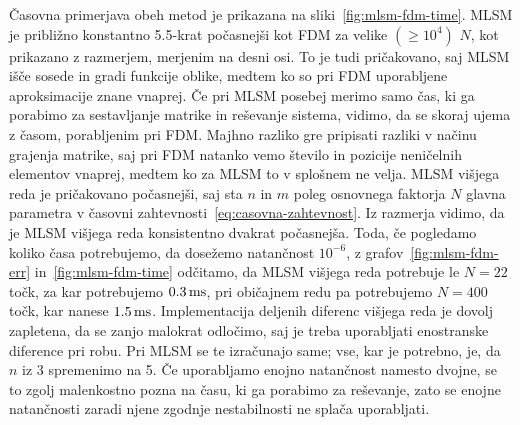 \documentclass[12pt,a4paper,twoside]{article}
\theoremstyle{definition} %
\theoremstyle{plain} %
\numberwithin{equation}{section}
\begin{document}
Časovna primerjava obeh metod je prikazana na sliki~\ref{fig:mlsm-fdm-time}. MLSM je približno
konstantno 5.5-krat počasnejši kot FDM za velike $(\geq 10^4)$ $N$, kot prikazano z razmerjem,
merjenim na desni osi. To je tudi pričakovano, saj MLSM išče sosede in gradi funkcije oblike, medtem
ko so pri FDM uporabljene aproksimacije znane vnaprej. Če pri MLSM posebej merimo samo čas, ki ga
porabimo za sestavljanje matrike in reševanje sistema, vidimo, da se skoraj ujema z časom,
porabljenim pri FDM. Majhno razliko gre pripisati razliki v načinu grajenja matrike, saj pri FDM
natanko vemo število in pozicije neničelnih elementov vnaprej, medtem ko za MLSM to v splošnem ne
velja. MLSM višjega reda je pričakovano počasnejši, saj sta $n$ in $m$ poleg osnovnega faktorja $N$
glavna parametra v časovni zahtevnosti~\eqref{eq:casovna-zahtevnost}. Iz razmerja vidimo, da je MLSM
višjega reda konsistentno dvakrat počasnejša. Toda, če pogledamo koliko časa potrebujemo, da
dosežemo natančnost $10^{-6}$, z grafov~\ref{fig:mlsm-fdm-err} in~\ref{fig:mlsm-fdm-time} odčitamo,
da MLSM višjega reda potrebuje le $N = 22$ točk, za kar potrebujemo $\unit[0.3]{ms}$, pri običajnem
redu pa potrebujemo $N = 400$ točk, kar nanese $\unit[1.5]{ms}$. Implementacija deljenih diferenc
višjega reda je dovolj zapletena, da se zanjo malokrat odločimo, saj je treba uporabljati enostranske
diference pri robu. Pri MLSM se te izračunajo same; vse, kar je potrebno, je, da $n$ iz 3 spremenimo
na 5. Če uporabljamo enojno natančnost namesto dvojne, se to zgolj malenkostno pozna na času, ki ga
porabimo za reševanje, zato se enojne natančnosti zaradi njene zgodnje nestabilnosti ne splača uporabljati.
\end{document}
